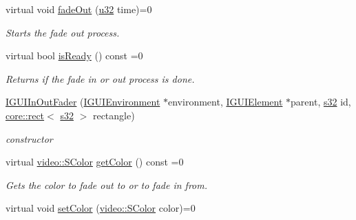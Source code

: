 \begin{DoxyCompactItemize}
virtual void \hyperlink{classirr_1_1gui_1_1IGUIInOutFader_a5006c28699050d73be11b15ffc7ba993}{fade\+Out} (\hyperlink{namespaceirr_a0416a53257075833e7002efd0a18e804}{u32} time)=0
\begin{DoxyCompactList}\small\item\em Starts the fade out process. \end{DoxyCompactList}\item 
\mbox{\label{classirr_1_1gui_1_1IGUIInOutFader_a8a917f7c5c74ff0bdb2ba844f1953387}} 
virtual bool \hyperlink{classirr_1_1gui_1_1IGUIInOutFader_a8a917f7c5c74ff0bdb2ba844f1953387}{is\+Ready} () const =0
\begin{DoxyCompactList}\small\item\em Returns if the fade in or out process is done. \end{DoxyCompactList}\item 
\mbox{\label{classirr_1_1gui_1_1IGUIInOutFader_ad839c9be778846aa0fba823c7dd30c69}} 
\hyperlink{classirr_1_1gui_1_1IGUIInOutFader_ad839c9be778846aa0fba823c7dd30c69}{I\+G\+U\+I\+In\+Out\+Fader} (\hyperlink{classirr_1_1gui_1_1IGUIEnvironment}{I\+G\+U\+I\+Environment} $\ast$environment, \hyperlink{classirr_1_1gui_1_1IGUIElement}{I\+G\+U\+I\+Element} $\ast$parent, \hyperlink{namespaceirr_ac66849b7a6ed16e30ebede579f9b47c6}{s32} id, \hyperlink{classirr_1_1core_1_1rect}{core\+::rect}$<$ \hyperlink{namespaceirr_ac66849b7a6ed16e30ebede579f9b47c6}{s32} $>$ rectangle)
\begin{DoxyCompactList}\small\item\em constructor \end{DoxyCompactList}\item 
\mbox{\label{classirr_1_1gui_1_1IGUIInOutFader_adeed9c5ffd4b9ab6180cba40596742b9}} 
virtual \hyperlink{classirr_1_1video_1_1SColor}{video\+::\+S\+Color} \hyperlink{classirr_1_1gui_1_1IGUIInOutFader_adeed9c5ffd4b9ab6180cba40596742b9}{get\+Color} () const =0
\begin{DoxyCompactList}\small\item\em Gets the color to fade out to or to fade in from. \end{DoxyCompactList}\item 
virtual void \hyperlink{classirr_1_1gui_1_1IGUIInOutFader_aba1cdb4928662a2340aa6600850e03d1}{set\+Color} (\hyperlink{classirr_1_1video_1_1SColor}{video\+::\+S\+Color} color)=0

\end{DoxyCompactItemize}
